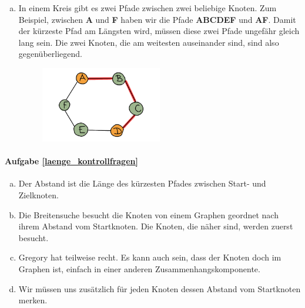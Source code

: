 \begin{enumerate}[(a)]
\item In einem Kreis gibt es zwei Pfade zwischen zwei beliebige Knoten. Zum Beispiel, zwischen \textbf{A} und \textbf{F} haben wir die Pfade \textbf{ABCDEF} und \textbf{AF}. Damit der kürzeste Pfad am Längsten wird, müssen diese zwei Pfade ungefähr gleich lang sein. Die zwei Knoten, die am weitesten auseinander sind, sind also gegenüberliegend.
\begin{figure}[H]
    \centering
    \includegraphics[width=0.5\textwidth]{Pictures/SP/abstand_kreis6.png}
\end{figure}
\end{enumerate}

\paragraph{Aufgabe \ref{laenge_kontrollfragen}}
\begin{enumerate}[(a)]
\item Der Abstand ist die Länge des kürzesten Pfades zwischen Start- und Zielknoten.
\item Die Breitensuche besucht die Knoten von einem Graphen geordnet nach ihrem Abstand vom Startknoten. Die Knoten, die näher sind, werden zuerst besucht.
\item Gregory hat teilweise recht. Es kann auch sein, dass der Knoten doch im Graphen ist, einfach in einer anderen Zusammenhangskomponente.
\item Wir müssen uns zusätzlich für jeden Knoten dessen Abstand vom Startknoten merken.
\end{enumerate}

